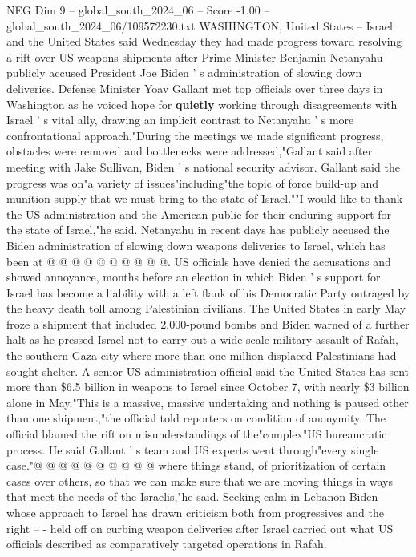 \begin{textsample}{NEG Dim 9 – global\_south\_2024\_06 – Score -1.00 – global\_south\_2024\_06/109572230.txt}  \label{ex:f9_neg_401}
WASHINGTON, United States -- Israel and the United States said Wednesday they had made progress toward resolving a rift over US weapons shipments after Prime Minister Benjamin Netanyahu publicly accused President Joe Biden ' s administration of slowing down deliveries.
Defense Minister Yoav Gallant met top officials over three days in Washington as he voiced hope for \textbf{quietly} working through disagreements with Israel ' s vital ally, drawing an implicit contrast to Netanyahu ' s more confrontational approach."During the meetings we made significant progress, obstacles were removed and bottlenecks were addressed,"Gallant said after meeting with Jake Sullivan, Biden ' s national security advisor.
Gallant said the progress was on"a variety of issues"including"the topic of force build-up and munition supply that we must bring to the state of Israel.""I would like to thank the US administration and the American public for their enduring support for the state of Israel,"he said.
Netanyahu in recent days has publicly accused the Biden administration of slowing down weapons deliveries to Israel, which has been at @ @ @ @ @ @ @ @ @ @.
US officials have denied the accusations and showed annoyance, months before an election in which Biden ' s support for Israel has become a liability with a left flank of his Democratic Party outraged by the heavy death toll among Palestinian civilians.
The United States in early May froze a shipment that included 2,000-pound bombs and Biden warned of a further halt as he pressed Israel not to carry out a wide-scale military assault of Rafah, the southern Gaza city where more than one million displaced Palestinians had sought shelter.
A senior US administration official said the United States has sent more than \$6.5 billion in weapons to Israel since October 7, with nearly \$3 billion alone in May."This is a massive, massive undertaking and nothing is paused other than one shipment,"the official told reporters on condition of anonymity.
The official blamed the rift on misunderstandings of the"complex"US bureaucratic process.
He said Gallant ' s team and US experts went through"every single case."@ @ @ @ @ @ @ @ @ @ where things stand, of prioritization of certain cases over others, so that we can make sure that we are moving things in ways that meet the needs of the Israelis,"he said.
Seeking calm in Lebanon Biden -- whose approach to Israel has drawn criticism both from progressives and the right -- - held off on curbing weapon deliveries after Israel carried out what US officials described as comparatively targeted operations in Rafah.

\end{textsample}
